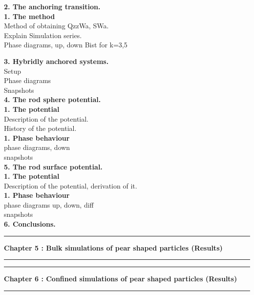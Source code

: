 \documentclass[a4paper]{article}
\newcommand{\mkChapBig}[1]
	{
	\newpage
	\hrule
	\begin{center}
	\LARGE\textbf{#1}
	\end{center}
	\hrule
	\vspace{5mm}
	}
\newcommand{\mkSectionBig}[1]
	{
	\Large\textbf{#1}\\
	}
\newcommand{\mkSubSectionBig}[1]
	{
	\hspace*{10mm}\large\textbf{#1}\\
	}
\begin{document}
\mkSectionBig{2. The anchoring transition.}

\mkSubSectionBig{1. The method}
Method of obtaining QzzWa, SWa.\\
Explain Simulation series.\\
Phase diagrams, up, down Bist for k=3,5\\

\newpage
\mkSectionBig{3. Hybridly anchored systems.}
Setup\\
Phase diagrams\\
Snapshots\\

\mkSectionBig{4. The rod sphere potential.}

\mkSubSectionBig{1. The potential}
Description of the potential.\\
History of the potential.\\

\mkSubSectionBig{1. Phase behaviour}
phase diagrams, down\\
snapshots\\

\mkSectionBig{5. The rod surface potential.}

\mkSubSectionBig{1. The potential}
Description of the potential, derivation of it.\\

\mkSubSectionBig{1. Phase behaviour}
phase diagrams up, down, diff\\
snapshots\\

\mkSectionBig{6. Conclusions.}


\mkChapBig{Chapter 5 : Bulk simulations of pear shaped particles (Results)} 


\mkChapBig{Chapter 6 : Confined simulations of pear shaped particles (Results)} 


\end{document}
